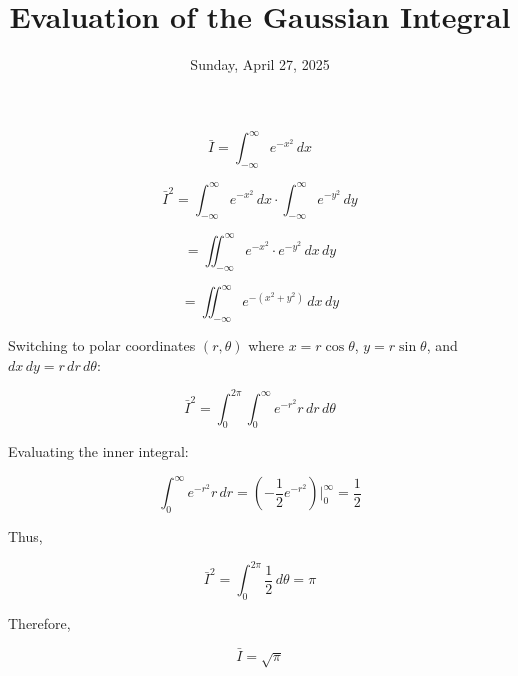 \documentclass{article}
\begin{document}
\title{Evaluation of the Gaussian Integral}
\author{}
\date{Sunday, April 27, 2025}
\maketitle

\begin{equation*}
    \bar{I} = \int_{-\infty}^{\infty} e^{-x^2} \, dx
\end{equation*}

\begin{equation*}
    \bar{I}^2 = \int_{-\infty}^{\infty} e^{-x^2} \, dx \cdot \int_{-\infty}^{\infty} e^{-y^2} \, dy
\end{equation*}

\begin{equation*}
    = \iint_{-\infty}^{\infty} e^{-x^2} \cdot e^{-y^2} \, dx \, dy
\end{equation*}

\begin{equation*}
    = \iint_{-\infty}^{\infty} e^{-(x^2 + y^2)} \, dx \, dy
\end{equation*}


Switching to polar coordinates $(r, \theta)$ where $x = r\cos\theta$, $y = r\sin\theta$, and $dx\,dy = r\,dr\,d\theta$:

\begin{equation*}
    \bar{I}^2 = \int_0^{2\pi} \int_0^{\infty} e^{-r^2} r \, dr \, d\theta
\end{equation*}

Evaluating the inner integral:

\begin{equation*}
    \int_0^{\infty} e^{-r^2} r \, dr = \left(-\frac{1}{2} e^{-r^2}\right)\Bigg|_0^{\infty} = \frac{1}{2}
\end{equation*}

Thus,

\begin{equation*}
    \bar{I}^2 = \int_0^{2\pi} \frac{1}{2} \, d\theta = \pi
\end{equation*}

Therefore,

\begin{equation*}
    \bar{I} = \sqrt{\pi}
\end{equation*}
\end{document}
